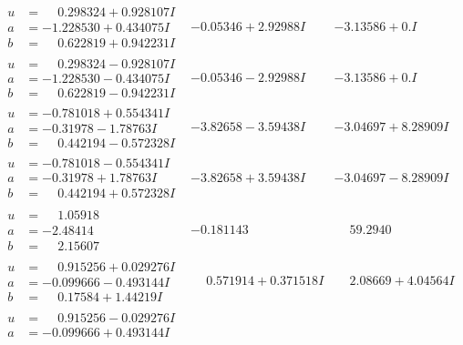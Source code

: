 \documentclass[1p]{elsarticle_modified}
\theoremstyle{definition}
\begin{document}
$$\begin{array}{c|c|c}
\begin{aligned}
u &= \phantom{-}0.298324 + 0.928107 I \\
a &= -1.228530 + 0.434075 I \\
b &= \phantom{-}0.622819 + 0.942231 I\end{aligned}
 & -0.05346 + 2.92988 I & -3.13586 + 0. I\phantom{ +0.000000I} \\ \hline\begin{aligned}
u &= \phantom{-}0.298324 - 0.928107 I \\
a &= -1.228530 - 0.434075 I \\
b &= \phantom{-}0.622819 - 0.942231 I\end{aligned}
 & -0.05346 - 2.92988 I & -3.13586 + 0. I\phantom{ +0.000000I} \\ \hline\begin{aligned}
u &= -0.781018 + 0.554341 I \\
a &= -0.31978 - 1.78763 I \\
b &= \phantom{-}0.442194 - 0.572328 I\end{aligned}
 & -3.82658 - 3.59438 I & -3.04697 + 8.28909 I \\ \hline\begin{aligned}
u &= -0.781018 - 0.554341 I \\
a &= -0.31978 + 1.78763 I \\
b &= \phantom{-}0.442194 + 0.572328 I\end{aligned}
 & -3.82658 + 3.59438 I & -3.04697 - 8.28909 I \\ \hline\begin{aligned}
u &= \phantom{-}1.05918\phantom{ +0.000000I} \\
a &= -2.48414\phantom{ +0.000000I} \\
b &= \phantom{-}2.15607\phantom{ +0.000000I}\end{aligned}
 & -0.181143\phantom{ +0.000000I} & \phantom{-}59.2940\phantom{ +0.000000I} \\ \hline\begin{aligned}
u &= \phantom{-}0.915256 + 0.029276 I \\
a &= -0.099666 - 0.493144 I \\
b &= \phantom{-}0.17584 + 1.44219 I\end{aligned}
 & \phantom{-}0.571914 + 0.371518 I & \phantom{-}2.08669 + 4.04564 I \\ \hline\begin{aligned}
u &= \phantom{-}0.915256 - 0.029276 I \\
a &= -0.099666 + 0.493144 I \\

\end{aligned}
\end{array}$$
\end{document}
